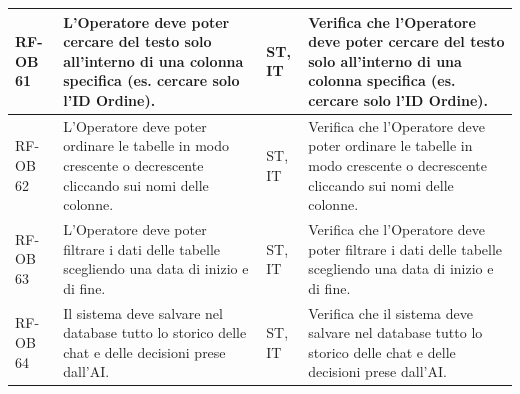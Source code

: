 \documentclass[a4paper,11pt,oneside]{scrartcl}
\begin{document}
\begin{longtable}{|p{1.5cm}|p{4.5cm}|p{1.8cm}|p{6cm}|}
    RF-OB 61         & L'Operatore deve poter cercare del testo solo all'interno di una colonna specifica (es. cercare solo l'ID Ordine).                                                                                                                                                                                    & ST, IT             & Verifica che l'Operatore deve poter cercare del testo solo all'interno di una colonna specifica (es. cercare solo l'ID Ordine).                                                                                                                                                                                    \\ \hline
    RF-OB 62         & L'Operatore deve poter ordinare le tabelle in modo crescente o decrescente cliccando sui nomi delle colonne.                                                                                                                                                                                          & ST, IT             & Verifica che l'Operatore deve poter ordinare le tabelle in modo crescente o decrescente cliccando sui nomi delle colonne.                                                                                                                                                                                          \\ \hline
    RF-OB 63         & L'Operatore deve poter filtrare i dati delle tabelle scegliendo una data di inizio e di fine.                                                                                                                                                                                                         & ST, IT             & Verifica che l'Operatore deve poter filtrare i dati delle tabelle scegliendo una data di inizio e di fine.                                                                                                                                                                                                         \\ \hline
    RF-OB 64         & Il sistema deve salvare nel database tutto lo storico delle chat e delle decisioni prese dall'AI.                                                                                                                                                                                                     & ST, IT             & Verifica che il sistema deve salvare nel database tutto lo storico delle chat e delle decisioni prese dall'AI.                                                                                                                                                                                                     \\ \hline

\end{longtable}
\end{document}
